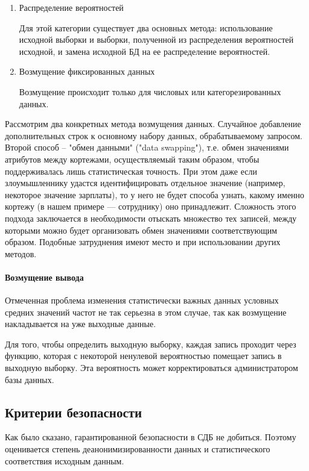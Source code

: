 \begin{enumerate}
  \item Распределение вероятностей

Для этой категории существует два основных метода: использование исходной выборки и выборки, полученной из распределения вероятностей исходной, и замена исходной БД на ее распределение вероятностей.

  \item Возмущение фиксированных данных

Возмущение происходит только для числовых или категорезированных данных.

\end{enumerate}


Рассмотрим два конкретных метода возмущения данных.
Случайное добавление дополнительных строк к основному набору данных, обрабатываемому запросом.
Второй способ -- "обмен данными" ("data swapping"), т.е. обмен значениями атрибутов между кортежами, осуществляемый таким образом, чтобы поддерживалась лишь статистическая точность. При этом даже если злоумышленнику удастся идентифицировать отдельное значение (например, некоторое значение зарплаты), то у него не будет способа узнать, какому именно кортежу (в нашем примере — сотруднику) оно принадлежит. Сложность этого подхода заключается в необходимости отыскать множество тех записей, между которыми можно будет организовать обмен значениями соответствующим образом. Подобные затруднения имеют место и при использовании других методов.

\paragraph{Возмущение вывода}

Отмеченная проблема изменения статистически важных данных условных средних значений частот не так серьезна в этом случае, так как возмущение накладывается на уже выходные данные.

Для того, чтобы определить выходную выборку, каждая запись проходит через функцию, которая с некоторой ненулевой вероятностью помещает запись в выходную выборку. Эта вероятность может корректироваться администратором базы данных.

  \subsection{Критерии безопасности}

Как было сказано, гарантированной безопасности в СДБ не добиться. Поэтому оценивается степень деанонимизированности данных и статистического соответствия исходным данным.

